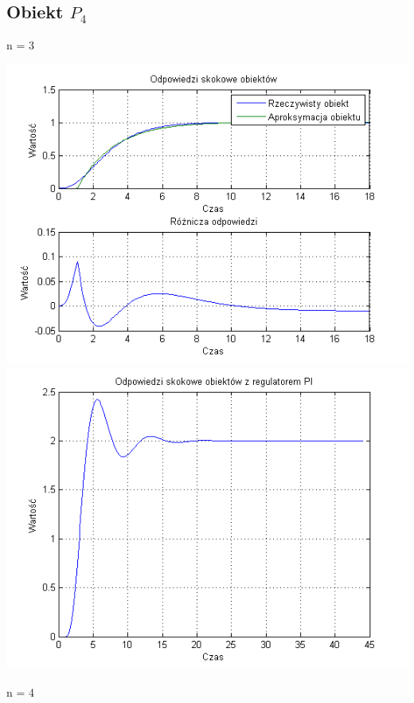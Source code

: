\documentclass[10pt,a4paper]{article}
\begin{document}
\subsection{Obiekt $P_4$}
n = 3
\begin{center}
\includegraphics[scale=1]{images/jeden/skrypt_105.png}\\
\includegraphics[scale=1]{images/jeden/skrypt_106.png}\\
\end{center}
\newpage
n = 4
\end{document}

